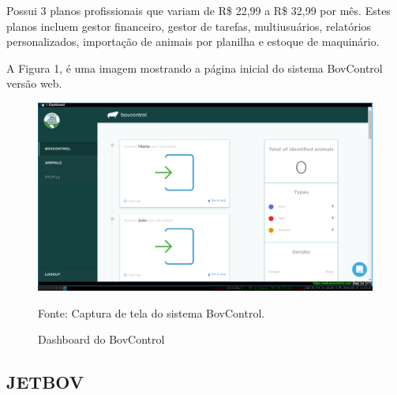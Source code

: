 Possui 3 planos profissionais que variam de R\$ 22,99 a R\$ 32,99 por mês. Estes planos incluem gestor financeiro, gestor de tarefas, multiusuários, relatórios personalizados, importação de animais por planilha e estoque de maquinário.

A Figura 1, é uma imagem mostrando a página inicial do sistema BovControl versão web.

\begin{figure}[H]
	\begin{center}
		\caption{Dashboard do BovControl}
		\includegraphics[width=\textwidth]{../img/bovcontrol.png}

		Fonte: Captura de tela do sistema BovControl.
	\end{center}
\end{figure}







\subsection{JETBOV}


